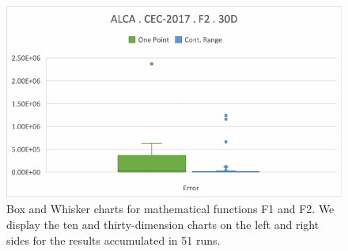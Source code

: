 \documentclass[graybox]{svmult}
\begin{document}
\begin{figure}[!ht]
\begin{minipage}[h]{0.49\linewidth}
        \end{minipage}
        \hfill
        \begin{minipage}[h]{0.49\linewidth}
            \includegraphics[width=1\linewidth]{img/fig_experiment_F2x30D.pdf} 
        \end{minipage}
        
        \caption{Box and Whisker charts for mathematical functions F1 and F2. We display the ten and thirty-dimension charts on the left and right sides for the results accumulated in 51 runs.} \label{fig.experiment_F1-F2}
    \end{figure}

    \FloatBarrier
\end{document}
